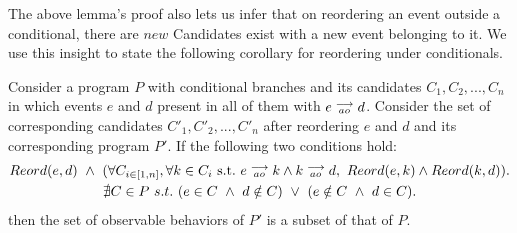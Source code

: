         The above lemma's proof also lets us infer that on reordering an event outside a conditional, there are $new$ Candidates exist with a new event belonging to it. 
        We use this insight to state the following corollary for reordering under conditionals. 
        \begin{corollary}
            \label{ReordCond}
            Consider a program $P$ with conditional branches and its candidates $C_1, C_2, ... , C_n$ in which events $e$ and $d$ present in all of them with $e\stackrel{\longrightarrow}{_{ao}}d$. Consider the set of corresponding candidates $C'_1, C'_2, ... , C'_n$ after reordering $e$ and $d$ and its corresponding program $P'$. If the following two conditions hold:
            \begin{gather*}
                Reord(e,d) \ \wedge \ 
                ( \forall C_{i \in [1,n]}, \forall k \in C_i \ \text{s.t.} \ \reln{e}{ao}{k} \wedge \reln{k}{ao}{d}, \    
                Reord(e,k) \wedge Reord(k,d) ). \\
                \nexists C \in P \ s.t. \ 
                    (e \in C \ \wedge \ d \notin C) \ \vee \ 
                    (e \notin C \ \wedge \ d \in C). 
            \end{gather*}
            then the set of observable behaviors of $P'$ is a subset of that of $P$. 
        \end{corollary}

